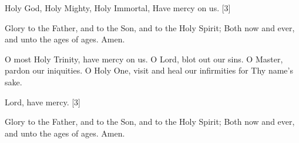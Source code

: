 Holy God, Holy Mighty, Holy Immortal, Have mercy on us. [3]

Glory to the Father, and to the Son, and to the Holy Spirit; Both now and ever, and unto the ages of ages. Amen.

O most Holy Trinity, have mercy on us. O Lord, blot out our sins. O Master, pardon our iniquities. O Holy One, visit and heal our infirmities for Thy name’s sake.

Lord, have mercy. [3]

Glory to the Father, and to the Son, and to the Holy Spirit; Both now and ever, and unto the ages of ages. Amen.
